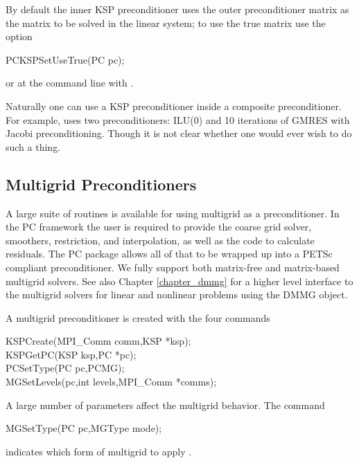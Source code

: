 By default the inner KSP preconditioner uses the outer preconditioner matrix 
as the matrix to be solved in the linear system; to use the true matrix use the 
option 
\begin{tabbing}
  PCKSPSetUseTrue(PC pc);
\end{tabbing}
or at the command line with . 

Naturally one can use a KSP preconditioner inside a composite preconditioner. For example,
uses two preconditioners: ILU(0) and 10 iterations of GMRES with Jacobi preconditioning. Though
it is not clear whether one would ever wish to do such a thing.

\subsection{Multigrid Preconditioners}  \label{sec_mg}

A large suite of routines is available for using multigrid as a
preconditioner. In the PC framework the user is required to provide 
the coarse grid solver, smoothers, restriction, and interpolation, 
as well as the code to calculate residuals. The PC package
allows all of that to be wrapped up into a PETSc compliant preconditioner. 
We fully support both matrix-free and matrix-based multigrid solvers. 
See also Chapter \ref{chapter_dmmg} for a higher level
interface to the multigrid solvers for linear and nonlinear problems using the DMMG object.

A multigrid preconditioner is created with the four commands 
\begin{tabbing}
  KSPCreate(MPI\_Comm comm,KSP *ksp);\\
  KSPGetPC(KSP ksp,PC *pc);\\
  PCSetType(PC pc,PCMG);\\
  MGSetLevels(pc,int levels,MPI\_Comm *comms);
\end{tabbing}
A  
large number of parameters affect the multigrid behavior. The command
\begin{tabbing}
  MGSetType(PC pc,MGType mode); 
\end{tabbing}
indicates which form of multigrid to apply \cite{1sbg}. 
  


